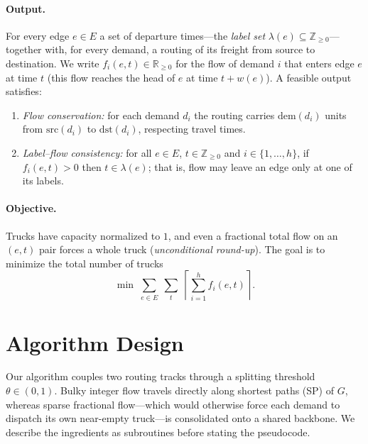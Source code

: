 \documentclass[11pt]{article}
\theoremstyle{definition}
\theoremstyle{remark}
\newcommand{\src}{\mathrm{src}}
\newcommand{\dst}{\mathrm{dst}}
\newcommand{\dem}{\mathrm{dem}}
\begin{document}
\paragraph{Output.}
For every edge $e\in E$ a set of departure times---the \emph{label set}
$\lambda(e)\subseteq\mathbb{Z}_{\ge 0}$---together with, for every demand, a routing of its freight
from source to destination. We write $f_i(e,t)\in\mathbb{R}_{\ge0}$ for the flow of demand $i$ that enters edge $e$
at time $t$ (this flow reaches the head of $e$ at time $t+w(e)$). A feasible output satisfies:
\begin{enumerate}[topsep=2pt,itemsep=1pt,label=(\roman*)]
  \item \emph{Flow conservation:} for each demand $d_i$ the routing carries $\dem(d_i)$ units from
        $\src(d_i)$ to $\dst(d_i)$, respecting travel times.
  \item \emph{Label--flow consistency:} for all $e\in E$, $t\in\mathbb{Z}_{\ge 0}$ and
        $i\in\{1,\dots,h\}$, if $f_i(e,t)>0$ then $t\in\lambda(e)$; that is, flow may leave an edge
        only at one of its labels.
\end{enumerate}

\paragraph{Objective.}
Trucks have capacity normalized to $1$, and even a fractional total flow on an $(e,t)$ pair forces a
whole truck (\emph{unconditional round-up}). The goal is to minimize the total number of trucks
\begin{equation}\label{eq:objective}
  \min \;\sum_{e\in E}\;\sum_{t}\;
  \left\lceil \sum_{i=1}^{h} f_i(e,t) \right\rceil .
\end{equation}

\section{Algorithm Design}

Our algorithm couples two routing tracks through a splitting threshold $\theta\in(0,1)$. Bulky integer
flow travels directly along shortest paths (SP) of $G$, whereas sparse fractional flow---which would
otherwise force each demand to dispatch its own near-empty truck---is consolidated onto a shared
backbone. We describe the ingredients as subroutines before stating the pseudocode.
\end{document}
